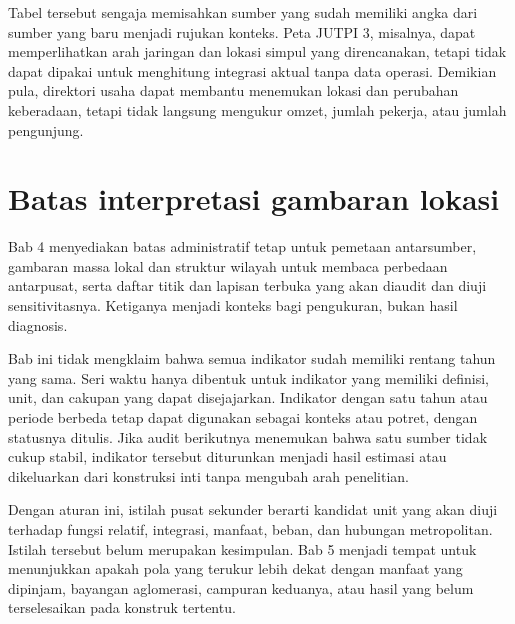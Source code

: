 \documentclass[11pt,a4paper,oneside,openany,indonesian]{report}
\begin{document}
Tabel tersebut sengaja memisahkan sumber yang sudah memiliki angka dari sumber yang baru menjadi rujukan konteks. Peta JUTPI 3, misalnya, dapat memperlihatkan arah jaringan dan lokasi simpul yang direncanakan, tetapi tidak dapat dipakai untuk menghitung integrasi aktual tanpa data operasi. Demikian pula, direktori usaha dapat membantu menemukan lokasi dan perubahan keberadaan, tetapi tidak langsung mengukur omzet, jumlah pekerja, atau jumlah pengunjung.

\section{Batas interpretasi gambaran lokasi}

Bab 4 menyediakan batas administratif tetap untuk pemetaan antarsumber, gambaran massa lokal dan struktur wilayah untuk membaca perbedaan antarpusat, serta daftar titik dan lapisan terbuka yang akan diaudit dan diuji sensitivitasnya. Ketiganya menjadi konteks bagi pengukuran, bukan hasil diagnosis.

Bab ini tidak mengklaim bahwa semua indikator sudah memiliki rentang tahun yang sama. Seri waktu hanya dibentuk untuk indikator yang memiliki definisi, unit, dan cakupan yang dapat disejajarkan. Indikator dengan satu tahun atau periode berbeda tetap dapat digunakan sebagai konteks atau potret, dengan statusnya ditulis. Jika audit berikutnya menemukan bahwa satu sumber tidak cukup stabil, indikator tersebut diturunkan menjadi hasil estimasi atau dikeluarkan dari konstruksi inti tanpa mengubah arah penelitian.

Dengan aturan ini, istilah pusat sekunder berarti kandidat unit yang akan diuji terhadap fungsi relatif, integrasi, manfaat, beban, dan hubungan metropolitan. Istilah tersebut belum merupakan kesimpulan. Bab 5 menjadi tempat untuk menunjukkan apakah pola yang terukur lebih dekat dengan manfaat yang dipinjam, bayangan aglomerasi, campuran keduanya, atau hasil yang belum terselesaikan pada konstruk tertentu.

\printbibliography[heading=bibintoc,title={Daftar Pustaka}]
\end{document}
